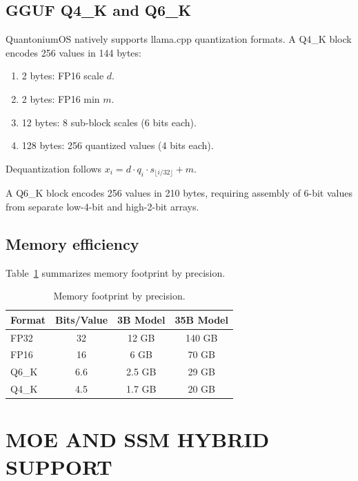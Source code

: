 \documentclass[aip,twocolumn,letterpaper]{revtex4}
\begin{document}
\subsection{GGUF Q4\_K and Q6\_K}

QuantoniumOS natively supports llama.cpp quantization formats. A Q4\_K block encodes 256 values in 144 bytes:
\begin{enumerate}
\item 2 bytes: FP16 scale \(d\).
\item 2 bytes: FP16 min \(m\).
\item 12 bytes: 8 sub-block scales (6 bits each).
\item 128 bytes: 256 quantized values (4 bits each).
\end{enumerate}
Dequantization follows \(x_i = d \cdot q_i \cdot s_{\lfloor i/32 \rfloor} + m\).

A Q6\_K block encodes 256 values in 210 bytes, requiring assembly of 6-bit values from separate low-4-bit and high-2-bit arrays.

\subsection{Memory efficiency}

Table~\ref{tab:memory} summarizes memory footprint by precision.

\begin{table}[t]
\caption{Memory footprint by precision.}
\label{tab:memory}
\begin{ruledtabular}
\begin{tabular}{lccc}
Format & Bits/Value & 3B Model & 35B Model \\
\hline
FP32 & 32 & 12 GB & 140 GB \\
FP16 & 16 & 6 GB & 70 GB \\
Q6\_K & 6.6 & 2.5 GB & 29 GB \\
Q4\_K & 4.5 & 1.7 GB & 20 GB \\
\end{tabular}
\end{ruledtabular}
\end{table}

\section{MOE AND SSM HYBRID SUPPORT}
\end{document}
